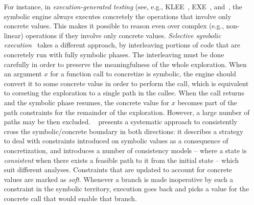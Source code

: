 \vspace{-2pt} 
 For instance, in {\em execution-generated testing} (see, e.g., {\sc KLEE}~\cite{KLEE-OSDI08}, {\sc EXE}~\cite{EXE-CCS06}, and~\cite{CS-CACM13}, the symbolic engine always executes concretely the operations that involve only concrete values. This makes it possible to reason even over complex (e.g., non-linear) operations if they involve only concrete values. {\em Selective symbolic execution}~\cite{CKC-TOCS12} takes a different approach, by interleaving portions of code that are concretely run with fully symbolic phases. The interleaving must be done carefully in order to preserve the meaningfulness of the whole exploration. When an argument $x$ for a function call to concretize is symbolic, the engine should convert it to some concrete value in order to perform the call, which is equivalent to corseting the exploration to a single path in the callee. When the call returns and the symbolic phase resumes, the concrete value for $x$ becomes part of the path constraints for the remainder of the exploration. However, a large number of paths may be then excluded. {\sc \stwoe}~\cite{CKC-TOCS12} presents a systematic approach to consistently cross the symbolic/concrete boundary in both directions: it describes a strategy to deal with constraints introduced on symbolic values as a consequence of concretization, and introduces a number of consistency models -- where a state is {\em consistent} when there exists a feasible path to it from the initial state -- which suit different analyses. Constraints that are updated to account for concrete values are marked as {\em soft}. Whenever a branch is made inoperative by such a constraint in the symbolic territory, execution goes back and picks a value for the concrete call that would enable that branch. 


